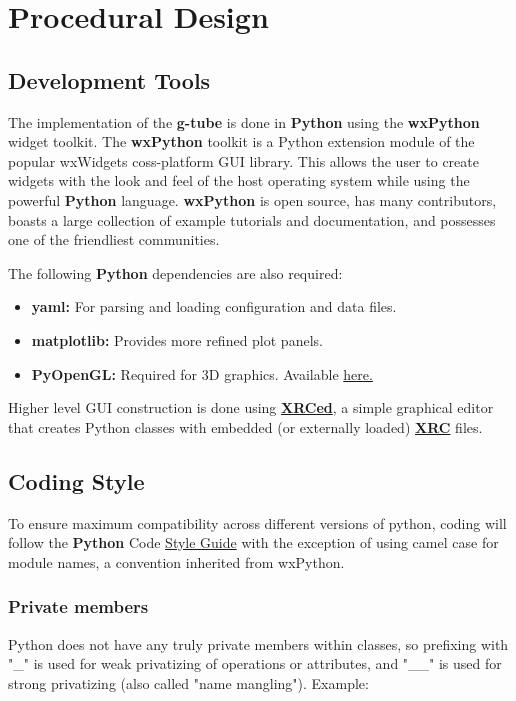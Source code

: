 \documentclass[12pt]{article}
\begin{document}
\section*{Procedural Design}

\subsection*{Development Tools}

	The implementation of the {\bf g-tube} is done in {\bf Python} using the {\bf wxPython} widget toolkit. The {\bf wxPython} toolkit is a Python extension module of the popular {wxWidgets} coss-platform GUI library. This allows the user to create widgets with the look and feel of the host operating system while using the powerful {\bf Python} language. {\bf wxPython} is open source, has many contributors, boasts a large collection of example tutorials and documentation, and possesses one of the friendliest communities. 


The following {\bf Python} dependencies are also required:

\begin{itemize}	
\item[] {\bf yaml:} For parsing and loading configuration and data files.
\item[] {\bf matplotlib:} Provides more refined plot panels.
\item[] {\bf PyOpenGL:} Required for 3D graphics. Available \href{http://pyopengl.sourceforge.net/}{here.}
\end{itemize}

Higher level GUI construction is done using \href{http://xrced.sourceforge.net/}{\bf XRCed}, a simple graphical editor that creates Python classes with embedded (or externally loaded) \href{http://wiki.wxpython.org/XRCTutorial}{\bf XRC} files. 


\subsection*{Coding Style}
	To ensure maximum compatibility across different versions of python, coding will follow the {\bf Python} Code \href{http://www.python.org/dev/peps/pep-0008/}{Style Guide} with the exception of using camel case for module names, a convention inherited from wxPython. 
	
\subsubsection*{Private members}	
	Python does not have any truly private members within classes, so prefixing with "\_" is used for weak privatizing of operations or attributes, and "\_\_" is used for strong privatizing (also called "name mangling"). Example:
	
\end{document}
